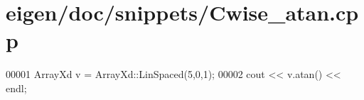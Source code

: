 \hypertarget{eigen_2doc_2snippets_2_cwise__atan_8cpp_source}{}\section{eigen/doc/snippets/\+Cwise\+\_\+atan.cpp}
\label{eigen_2doc_2snippets_2_cwise__atan_8cpp_source}

\begin{DoxyCode}
00001 ArrayXd v = ArrayXd::LinSpaced(5,0,1);
00002 cout << v.atan() << endl;
\end{DoxyCode}
